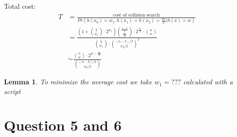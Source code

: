 \documentclass[12pt]{article}
\newtheorem{lemma}{Lemma}
\begin{document}
Total cost:
\[
\begin{split}
  T & = \frac{\text{cost of collision search}}{Pr(h(x_0) = w_1, h(x_1) = h(x_2) = \frac{w_2}{2} | h(x) = w)} \\
  & = \frac{(1+ \binom{k}{w_1}\cdot 2^{w_1})\binom{\frac{n-k}{2}}{\frac{w_2}{2}}\cdot 2^{\frac{w_2}{2}}\cdot \binom{n}{w}}{\binom{k}{w_1} \cdot \binom{(n-k)/2}{w_2/2}^{2}} \\
  & \sim \frac{\binom{n}{w} \cdot 2^{w - \frac{w_2}{2}}}{\binom{(n-k)/2}{w_2/2}}
\end{split}
\]
\begin{lemma}
To minimize the average cost we take $w_1 = ???$ calculated with a script
\end{lemma}
\section{Question 5 and 6}




\end{document}
